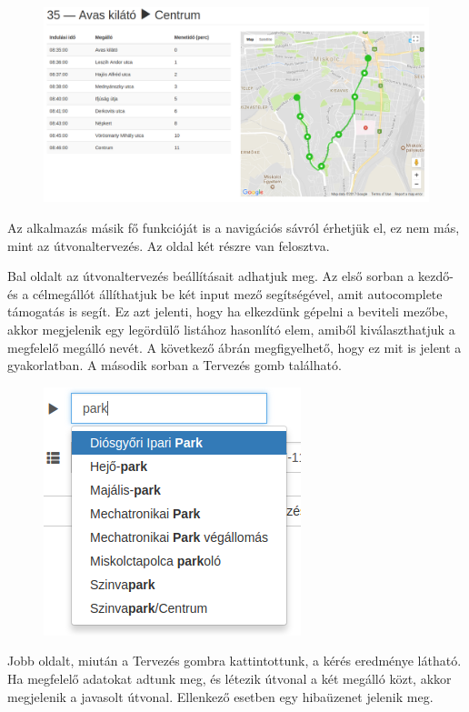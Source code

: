 \begin{figure}[h!]
\centering
\includegraphics[scale=0.35]{kepek/trip_tablazat_es_terkep.png}
\caption{}
\label{fig:trip_tablazat_es_terkep}
\end{figure}

Az alkalmazás másik fő funkcióját is a navigációs sávról érhetjük el, ez nem más, mint az útvonaltervezés. Az oldal két részre van felosztva.

Bal oldalt az útvonaltervezés beállításait adhatjuk meg. Az első sorban a kezdő- és a célmegállót állíthatjuk be két input mező segítségével, amit autocomplete támogatás is segít. Ez azt jelenti, hogy ha elkezdünk gépelni a beviteli mezőbe, akkor megjelenik egy legördülő listához hasonlító elem, amiből kiválaszthatjuk a megfelelő megálló nevét. A következő ábrán megfigyelhető, hogy ez mit is jelent a gyakorlatban. A második sorban a Tervezés gomb található.

\begin{figure}[h!]
\centering
\includegraphics[scale=0.6]{kepek/autocomplete.png}
\caption{}
\label{fig:autocomplete}
\end{figure}

Jobb oldalt, miután a Tervezés gombra kattintottunk, a kérés eredménye látható. Ha megfelelő adatokat adtunk meg, és létezik útvonal a két megálló közt, akkor megjelenik a javasolt útvonal. Ellenkező esetben egy hibaüzenet jelenik meg.

